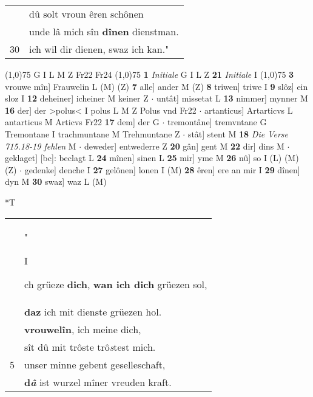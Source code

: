 \documentclass[8pt,a4paper,notitlepage]{article}
\begin{document}
\begin{table}[ht]
\begin{minipage}[t]{0.5\linewidth}
\begin{tabular}{rl}
 & dû solt vroun êren schônen\\ 
 & unde lâ mich sîn \textbf{dînen} dienstman.\\ 
30 & ich wil dir dienen, swaz ich kan."\\ 
\end{tabular}
\scriptsize
\line(1,0){75} \newline
G I L M Z Fr22 Fr24 \newline
\line(1,0){75} \newline
\textbf{1} \textit{Initiale} G I L Z  \textbf{21} \textit{Initiale} I  \newline
\line(1,0){75} \newline
\textbf{3} vrouwe mîn] Frauwelin L (M) (Z) \textbf{7} alle] ander M (Z) \textbf{8} triwen] triwe I \textbf{9} slôz] ein sloz I \textbf{12} deheiner] icheiner M keiner Z  $\cdot$ untât] missetat L \textbf{13} nimmer] mynner M \textbf{16} der] der >polus< I polus L M Z Polus vnd Fr22  $\cdot$ artanticus] Artarticvs L antarticus M Articvs Fr22 \textbf{17} dem] der G  $\cdot$ tremontâne] tremvntane G Tremontane I trachmuntane M Trehmuntane Z  $\cdot$ stât] stent M \textbf{18} \textit{Die Verse 715.18-19 fehlen} M   $\cdot$ deweder] entwederre Z \textbf{20} gân] gent M \textbf{22} dir] dins M  $\cdot$ geklaget] [bc]: beclagt L \textbf{24} mînen] sinen L \textbf{25} mir] yme M \textbf{26} nû] so I (L) (M) (Z)  $\cdot$ gedenke] denche I \textbf{27} gelônen] lonen I (M) \textbf{28} êren] ere an mir I \textbf{29} dînen] dyn M \textbf{30} swaz] waz L (M) \newline
\end{minipage}
\hspace{0.5cm}
\begin{minipage}[t]{0.5\linewidth}
\small
\begin{center}*T
\end{center}
\begin{tabular}{rl}
 & "\begin{large}I\end{large}ch grüeze \textbf{dich}, \textbf{wan ich dich} grüezen sol,\\ 
 & \textbf{daz} ich mit dienste grüezen hol.\\ 
 & \textbf{vrouwelîn}, ich meine dich,\\ 
 & sît dû mit trôste trô\textit{s}test mich.\\ 
5 & unser minne gebent geselleschaft,\\ 
 & \textbf{d\textit{â}} ist wurzel mîner vreuden kraft.\\ 

\end{tabular}
\end{minipage}
\end{table}
\end{document}
